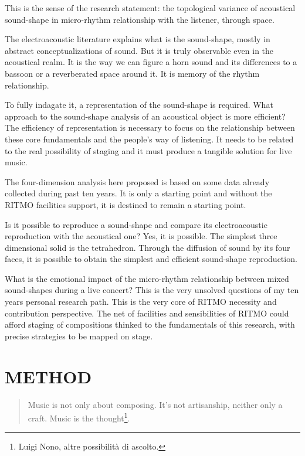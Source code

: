 \documentclass[
	12pt,
	a4paper,
	twocolumn
	]{article}
\begin{document}
This is the sense of the research statement: the topological variance of acoustical sound-shape in micro-rhythm relationship with the listener, through space. 

The electroacoustic literature explains what is the sound-shape, mostly in abstract conceptualizations of sound. But it is truly observable even in the acoustical realm. It is the way we can figure a horn sound and its differences to a bassoon or a reverberated space around it. It is memory of the rhythm relationship.

To fully indagate it, a representation of the sound-shape is required. What approach to the sound-shape analysis of an acoustical object is more efficient? The efficiency of representation is necessary to focus on the relationship between these core fundamentals and the people's way of listening. It needs to be related to the real possibility of staging and it must produce a tangible solution for live music. 

The four-dimension analysis here proposed is based on some data already collected during past ten years. It is only a starting point and without the RITMO facilities support, it is destined to remain a starting point. 

Is it possible to reproduce a sound-shape and compare its electroacoustic reproduction with the acoustical one? Yes, it is possible. The simplest three dimensional solid is the tetrahedron. Through the diffusion of sound by its four faces, it is possible to obtain the simplest and efficient sound-shape reproduction. 

What is the emotional impact of the micro-rhythm relationship between mixed sound-shapes during a live concert? This is the very unsolved questions of my ten years personal research path. This is the very core of RITMO necessity and contribution perspective. The net of facilities and sensibilities of RITMO could afford staging of compositions thinked to the fundamentals of this research, with precise strategies to be mapped on stage. 

\section*{METHOD}
\begin{quote}
Music is not only about composing. It’s not artisanship, neither only a craft. Music is the thought\footnote{Luigi Nono, altre possibilità di ascolto.}.
\end{quote}
\end{document}
